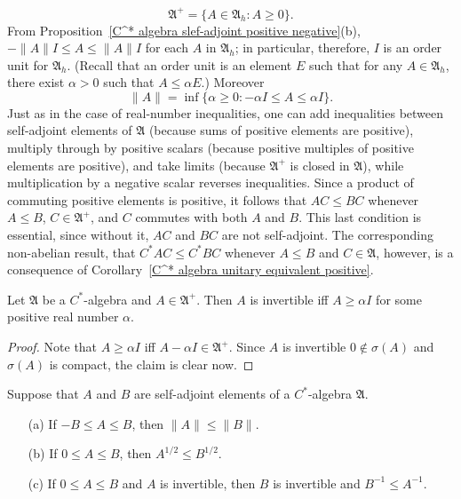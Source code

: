 \[\mathfrak{A}^+=\{A\in\mathfrak{A}_h:A\geq 0\}.\]
From Proposition~\ref{C^* algebra slef-adjoint positive negative}(b), $-\|A\|I\leq A\leq\|A\|I$ for each $A$ in $\mathfrak{A}_h$; in particular, therefore, $I$ is an order unit for $\mathfrak{A}_h$. (Recall that an order unit is an element $E$ such that for any $A\in\mathfrak{A}_h$, there exist $\alpha>0$ such that $A\leq\alpha E$.) Moreover
\[\|A\|=\inf\{\alpha\geq 0:-\alpha I\leq A\leq\alpha I\}.\]
Just as in the case of real-number inequalities, one can add inequalities between self-adjoint elements of $\mathfrak{A}$ (because sums of positive elements are positive), multiply through by positive scalars (because positive multiples of positive elements are positive), and take limits (because $\mathfrak{A}^+$ is closed in $\mathfrak{A}$), while multiplication by a negative scalar reverses inequalities. Since a product of commuting positive elements is positive, it follows that $AC\leq BC$ whenever $A\leq B$, $C\in\mathfrak{A}^+$, and $C$ commutes with both $A$ and $B$. This last condition is essential, since without it, $AC$ and $BC$ are not self-adjoint. The corresponding non-abelian result, that $C^*AC\leq C^*BC$ whenever $A\leq B$ and $C\in\mathfrak{A}$, however, is a
consequence of Corollary~\ref{C^* algebra unitary equivalent positive}.
\begin{proposition}\label{C^* algebra positive element invertible iff}
Let $\mathfrak{A}$ be a $C^*$-algebra and $A\in\mathfrak{A}^+$. Then $A$ is invertible iff $A\geq\alpha I$ for some positive real number $\alpha$.
\end{proposition}
\begin{proof}
Note that $A\geq\alpha I$ iff $A-\alpha I\in\mathfrak{A}^+$. Since $A$ is invertible $0\notin\sigma(A)$ and $\sigma(A)$ is compact, the claim is clear now.
\end{proof}
\begin{proposition}\label{C^* algebra positive element order prop}
Suppose that $A$ and $B$ are self-adjoint elements of a $C^*$-algebra $\mathfrak{A}$.
\begin{itemize}
\item[(a)] If $-B\leq A\leq B$, then $\|A\|\leq\|B\|$.
\item[(b)] If $0\leq A\leq B$, then $A^{1/2}\leq B^{1/2}$.
\item[(c)] If $0\leq A\leq B$ and $A$ is invertible, then $B$ is invertible and $B^{-1}\leq A^{-1}$.
\end{itemize}
\end{proposition}
